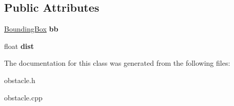 \subsection*{Public Attributes}
\begin{DoxyCompactItemize}
\item 
\mbox{\label{class_obstacle_a65deb910953edc483114ce15d948400e}} 
\mbox{\hyperlink{class_bounding_box}{Bounding\+Box}} {\bfseries bb}
\item 
\mbox{\label{class_obstacle_a7ae604dd6e20ad1a8610dcd38f123c15}} 
float {\bfseries dist}
\end{DoxyCompactItemize}


The documentation for this class was generated from the following files\+:\begin{DoxyCompactItemize}
\item 
obstacle.\+h\item 
obstacle.\+cpp\end{DoxyCompactItemize}
